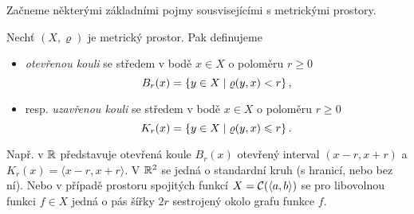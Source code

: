 Začneme některými základními pojmy sousvisejícími s metrickými prostory.
\begin{definition}\label{def:koule-mp}
    Nechť $(X,\varrho)$ je metrický prostor. Pak definujeme
    \begin{itemize}
        \item \emph{otevřenou kouli} se středem v bodě $x\in X$ o poloměru $r\geqslant 0$
        \[B_r(x)=\left\{y\in X\mid\varrho(y,x)<r\right\},\]
        \item resp. \emph{uzavřenou kouli} se středem v bodě $x\in X$ o poloměru $r\geqslant 0$
        \[K_r(x)=\left\{y\in X\mid\varrho(y,x)\leqslant r\right\}.\]
    \end{itemize}
\end{definition}
Např. v $\mathbb{R}$ představuje otevřená koule $B_r(x)$ otevřený interval $(x-r,x+r)$ a $K_r(x)=\langle x-r,x+r\rangle$. V $\mathbb{R}^2$ se jedná o standardní kruh (s hranicí, nebo bez ní). Nebo v případě prostoru spojitých funkcí $X=\mathcal{C}(\langle a,b\rangle)$ se pro libovolnou funkci $f\in X$ jedná o pás šířky $2r$ sestrojený okolo grafu funkce $f$.

